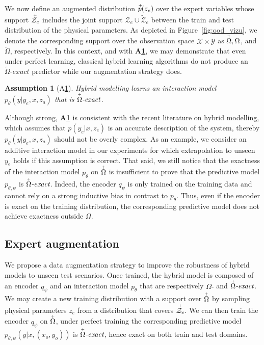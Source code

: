 \documentclass{article}
\newtheorem{hyp}{Assumption}
\newcommand\figref{Figure~\ref}
\newcommand\hypref{A\ref}
\begin{document}
We now define an augmented distribution $\accentset{+}{p}(z_e)$ over the expert variables whose support $\accentset{+}{\mathcal{Z}}_e$ includes the joint support $\mathcal{Z}_e \cup \tilde{\mathcal{Z}}_e$ between the train and test distribution of the physical parameters. As depicted in \figref{fig:ood_vizu}, we denote the corresponding support over the observation space $\mathcal{X} \times \mathcal{Y}$ as $\accentset{+}{\Omega}, \Omega$, and $\tilde{\Omega}$, respectively. In this context, and with \textbf{\hypref{hyp:first}}, we may demonstrate that even under perfect learning, classical hybrid learning algorithms do not produce an $\tilde{\Omega}\textit{-exact}$ predictor while our augmentation strategy does.
\begin{hyp}[A\ref{hyp:first}] \label{hyp:first}
Hybrid modelling learns an interaction model $p_\theta(y|y_e, x, z_a)$ that is $\accentset{+}{\Omega}\textit{-exact}$. 
\end{hyp}
Although strong, \textbf{\hypref{hyp:first}} is consistent with the recent literature on hybrid modelling, which assumes that $p(y_e|x, z_e)$ is an accurate description of the system, thereby $p_\theta(y|y_e, x, z_a)$ should not be overly complex. As an example, we consider an additive interaction model in our experiments for which extrapolation to unseen $y_e$ holds if this assumption is correct. That said, we still notice that the exactness of the interaction model $p_\theta$ on $\accentset{+}{\Omega}$ is insufficient to prove that the predictive model $p_{\theta, \psi}$ is $\accentset{+}{\Omega}\textit{-exact}$. Indeed, the encoder $q_\psi$ is only trained on the training data and cannot rely on a strong inductive bias in contrast to $p_\theta$. Thus, even if the encoder is exact on the training distribution, the corresponding predictive model does not achieve exactness outside $\Omega$. 

\subsection{Expert augmentation}
We propose a data augmentation strategy to improve the robustness of hybrid models to unseen test scenarios. Once trained, the hybrid model is composed of an encoder $q_\psi$ and an interaction model $p_\theta$ that are respectively $\Omega\textit{-}$ and $\accentset{+}{\Omega}\textit{-exact}$. We may create a new training distribution with a support over $\accentset{+}{\Omega}$ by sampling physical parameters $z_e$ from a distribution that covers $\accentset{+}{\mathcal{Z}}_e$. We can then train the encoder $q_\psi$ on $\accentset{+}{\Omega}$, under perfect training the corresponding predictive model $p_{\theta, \psi}(y|x, (x_o, y_o))$ is $\accentset{+}{\Omega}\textit{-exact}$, hence exact on both train and test domains.
\end{document}
